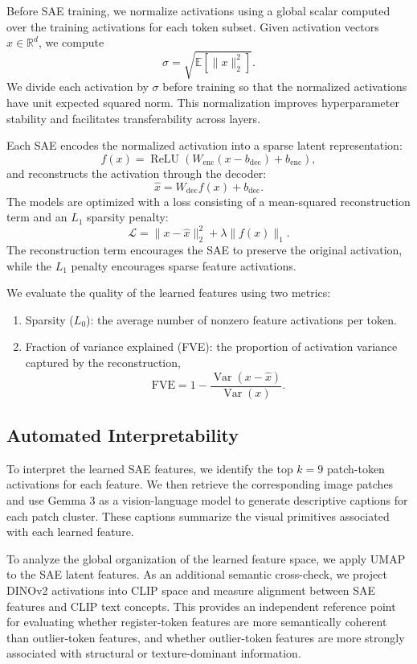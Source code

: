 \documentclass{article}
\theoremstyle{plain}
\theoremstyle{definition}
\theoremstyle{remark}
\begin{document}
Before SAE training, we normalize activations using a global scalar computed over the training activations for each token subset. Given activation vectors $x \in \mathbb{R}^d$, we compute
\[\sigma = \sqrt{\mathbb{E}[\|x\|_2^2]} .\]
We divide each activation by $\sigma$ before training so that the normalized activations have unit expected squared norm. This normalization improves hyperparameter stability and facilitates transferability across layers.


Each SAE encodes the normalized activation into a sparse latent representation:
\[f(x) = \operatorname{ReLU}\left(W_{\mathrm{enc}}(x - b_{\mathrm{dec}}) + b_{\mathrm{enc}}\right),\]
and reconstructs the activation through the decoder:
\[\hat{x} = W_{\mathrm{dec}} f(x) + b_{\mathrm{dec}} .\]
The models are optimized with a loss consisting of a mean-squared reconstruction term and an \(L_1\) sparsity penalty:
\[\mathcal{L} = \|x - \hat{x}\|_2^2 + \lambda \|f(x)\|_1 .\]
The reconstruction term encourages the SAE to preserve the original activation, while the \(L_1\) penalty encourages sparse feature activations.

We evaluate the quality of the learned features using two metrics:
\begin{enumerate}
    \item Sparsity ($L_0$): the average number of nonzero feature activations per token.
    \item Fraction of variance explained (FVE): the proportion of activation variance captured by the reconstruction,
    \[\mathrm{FVE} = 1 - \frac{\operatorname{Var}(x - \hat{x})}{\operatorname{Var}(x)} .\]
\end{enumerate}

\subsection{Automated Interpretability}

To interpret the learned SAE features, we identify the top \(k=9\) patch-token activations for each feature. We then retrieve the corresponding image patches and use Gemma 3 as a vision-language model to generate descriptive captions for each patch cluster. These captions summarize the visual primitives associated with each learned feature.

To analyze the global organization of the learned feature space, we apply UMAP to the SAE latent features. As an additional semantic cross-check, we project DINOv2 activations into CLIP space and measure alignment between SAE features and CLIP text concepts. This provides an independent reference point for evaluating whether register-token features are more semantically coherent than outlier-token features, and whether outlier-token features are more strongly associated with structural or texture-dominant information.
\end{document}
